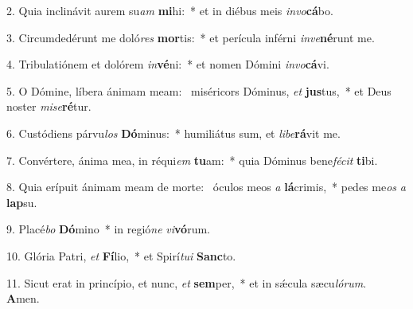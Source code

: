 2. Quia inclinávit aurem su\textit{am} \textbf{mi}hi:~*  et in diébus meis \textit{in}\textit{vo}\textbf{cá}bo.\

3. Circumdedérunt me doló\textit{res} \textbf{mor}tis:~*  et perícula inférni \textit{in}\textit{ve}\textbf{né}runt me.\

4. Tribulatiónem et dolórem \textit{in}\textbf{vé}ni:~*  et nomen Dómini \textit{in}\textit{vo}\textbf{cá}vi.\

5. O Dómine, líbera ánimam meam: \dag\  miséricors Dóminus, \textit{et} \textbf{jus}tus,~*  et Deus noster \textit{mi}\textit{se}\textbf{ré}tur.\

6. Custódiens párvu\textit{los} \textbf{Dó}minus:~*  humiliátus sum, et \textit{li}\textit{be}\textbf{rá}vit me.\

7. Convértere, ánima mea, in réqui\textit{em} \textbf{tu}am:~*  quia Dóminus bene\textit{fé}\textit{cit} \textbf{ti}bi.\

8. Quia erípuit ánimam meam de morte: \dag\  óculos meos \textit{a} \textbf{lá}crimis,~*  pedes me\textit{os} \textit{a} \textbf{lap}su.\

9. Placé\textit{bo} \textbf{Dó}mino~*  in regió\textit{ne} \textit{vi}\textbf{vó}rum.\

10. Glória Patri, \textit{et} \textbf{Fí}lio,~*  et Spirí\textit{tu}\textit{i} \textbf{Sanc}to.\

11. Sicut erat in princípio, et nunc, \textit{et} \textbf{sem}per,~*  et in sǽcula sæcu\textit{ló}\textit{rum}. \textbf{A}men.\

